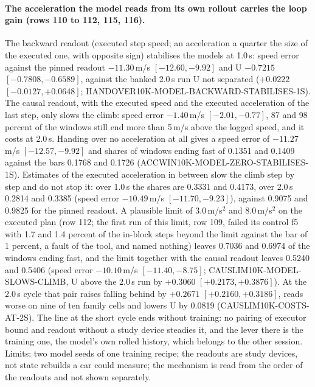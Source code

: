 \paragraph{The acceleration the model reads from its own rollout carries the loop gain (rows 110 to 112, 115, 116).} The backward readout (executed step speed; an acceleration a quarter the size of the executed one, with opposite sign) stabilises the models at 1.0\,s: speed error against the pinned readout $-11.30$\,m/s $[-12.60,-9.92]$ and U $-0.7215$ $[-0.7808,-0.6589]$, against the banked 2.0\,s run U not separated ($+0.0222$ $[-0.0127,+0.0648]$; HANDOVER10K-MODEL-BACKWARD-STABILISES-1S). The causal readout, with the executed speed and the executed acceleration of the last step, only slows the climb: speed error $-1.40$\,m/s $[-2.01,-0.77]$, 87 and 98 percent of the windows still end more than 5\,m/s above the logged speed, and it costs at 2.0\,s. Handing over no acceleration at all gives a speed error of $-11.27$\,m/s $[-12.57,-9.92]$ and shares of windows ending fast of 0.1351 and 0.1409 against the bars 0.1768 and 0.1726 (ACCWIN10K-MODEL-ZERO-STABILISES-1S). Estimates of the executed acceleration in between slow the climb step by step and do not stop it: over 1.0\,s the shares are 0.3331 and 0.4173, over 2.0\,s 0.2814 and 0.3385 (speed error $-10.49$\,m/s $[-11.70,-9.23]$), against 0.9075 and 0.9825 for the pinned readout. A plausible limit of 3.0\,m/s$^2$ and 8.0\,m/s$^2$ on the executed plan (row 112; the first run of this limit, row 109, failed its control f5 with 1.7 and 1.4 percent of the in-block steps beyond the limit against the bar of 1 percent, a fault of the tool, and named nothing) leaves 0.7036 and 0.6974 of the windows ending fast, and the limit together with the causal readout leaves 0.5240 and 0.5406 (speed error $-10.10$\,m/s $[-11.40,-8.75]$; CAUSLIM10K-MODEL-SLOWS-CLIMB, U above the 2.0\,s run by $+0.3060$ $[+0.2173,+0.3876]$). At the 2.0\,s cycle that pair raises falling behind by $+0.2671$ $[+0.2160,+0.3186]$, reads worse on nine of ten family cells and lowers U by 0.0819 (CAUSLIM10K-COSTS-AT-2S). The line at the short cycle ends without training: no pairing of executor bound and readout without a study device steadies it, and the lever there is the training one, the model's own rolled history, which belongs to the other session. Limits: two model seeds of one training recipe; the readouts are study devices, not state rebuilds a car could measure; the mechanism is read from the order of the readouts and not shown separately.

